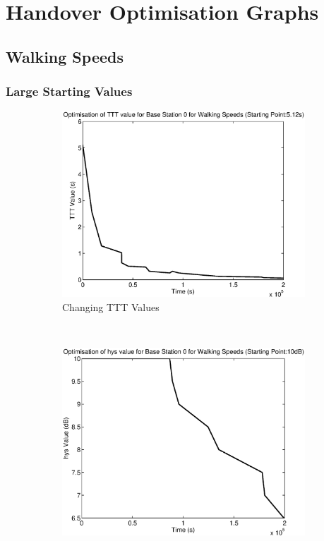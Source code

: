 \chapter{Handover Optimisation Graphs}
\section{Walking Speeds}\label{ap:walk}
\subsection{Large Starting Values}\label{ap:walk_large}
\begin{figure}[H]
        \centering
        \begin{subfigure}[b]{0.49\textwidth}
                \includegraphics[width=\textwidth]{figures/graphs/walkhigh/TTT0.eps}
                \caption{Changing TTT Values}
        \end{subfigure}%
        ~ %
        \begin{subfigure}[b]{0.49\textwidth}
                \includegraphics[width=\textwidth]{figures/graphs/walkhigh/hys0.eps}

\end{subfigure}
\end{figure}
